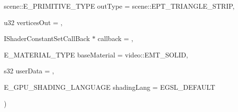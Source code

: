 {{\begin{DoxyParamCaption}
\item[{scene\-::\-E\-\_\-\-P\-R\-I\-M\-I\-T\-I\-V\-E\-\_\-\-T\-Y\-P\-E}]{out\-Type = {\ttfamily scene\-:\-:EPT\-\_\-TRIANGLE\-\_\-STRIP}, }
\item[{u32}]{vertices\-Out = {}, }
\item[{I\-Shader\-Constant\-Set\-Call\-Back $\ast$}]{callback = {}, }
\item[{E\-\_\-\-M\-A\-T\-E\-R\-I\-A\-L\-\_\-\-T\-Y\-P\-E}]{base\-Material = {\ttfamily video\-:\-:EMT\-\_\-SOLID}, }
\item[{s32}]{user\-Data = {}, }
\item[{E\-\_\-\-G\-P\-U\-\_\-\-S\-H\-A\-D\-I\-N\-G\-\_\-\-L\-A\-N\-G\-U\-A\-G\-E}]{shading\-Lang = {\ttfamily EGSL\-\_\-DEFAULT}}
\end{DoxyParamCaption}
)\hspace{0.3cm}{\ttfamily [virtual]}}}\label{classirr_1_1video_1_1_c_null_driver_a8b5d2aaf3363372f9dfb83de487f4774}
